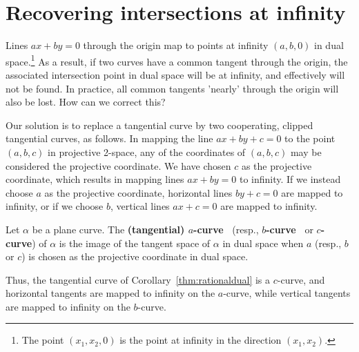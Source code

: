 \documentclass[10pt,twocolumn]{article}
\newcommand{\tang}{tangential curve\ }
\newcommand{\acurve}{$a$-curve\ }
\newcommand{\bcurve}{$b$-curve\ }
\begin{document}
{
}

\section{Recovering intersections at infinity}
\label{sec:infinity}

Lines $ax+by=0$ through the origin map to points at infinity
$(a,b,0)$ in dual space.\footnote{The point $(x_1,x_2,0)$ 
	is the point at infinity in the direction $(x_1,x_2)$.}
As a result, if two curves have a common tangent through the origin, 
the associated intersection point in dual space will be at infinity, 
and effectively will not be found.
In practice, all common tangents 'nearly' through the origin will also be lost.
How can we correct this?

Our solution is to replace a tangential curve by two cooperating,
clipped tangential curves, as follows.
In mapping the line $ax+by+c=0$ to the point $(a,b,c)$ in projective 2-space, 
any of the coordinates of $(a,b,c)$ may be considered the projective coordinate.
We have chosen $c$ as the projective coordinate, which results in mapping lines 
$ax+by=0$ to infinity.
If we instead choose $a$ as the projective coordinate, 
horizontal lines $by+c=0$ are mapped to infinity,
or if we choose $b$, vertical lines $ax+c=0$ are mapped to infinity.
%
\begin{defn2}
Let $\alpha$ be a plane curve.
The {\bf (tangential) \acurve} (resp., {\bf \bcurve} or {\bf $c$-curve}) 
of $\alpha$ is the image of 
the tangent space of $\alpha$ in dual space when $a$ (resp., $b$ or $c$) is chosen as the
projective coordinate in dual space.
\end{defn2}
%
Thus, the tangential curve of Corollary~\ref{thm:rationaldual}
is a $c$-curve, and horizontal tangents are mapped to infinity on the $a$-curve,
while vertical tangents are mapped to infinity on the $b$-curve.
\end{document}
